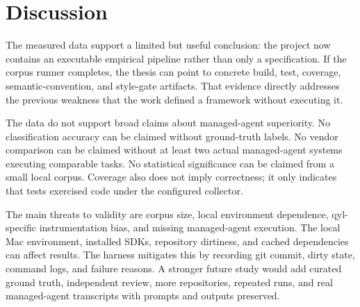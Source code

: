 \chapter{Discussion}

The measured data support a limited but useful conclusion: the project now contains an executable empirical pipeline rather than only a specification. If the corpus runner completes, the thesis can point to concrete build, test, coverage, semantic-convention, and style-gate artifacts. That evidence directly addresses the previous weakness that the work defined a framework without executing it.

The data do not support broad claims about managed-agent superiority. No classification accuracy can be claimed without ground-truth labels. No vendor comparison can be claimed without at least two actual managed-agent systems executing comparable tasks. No statistical significance can be claimed from a small local corpus. Coverage also does not imply correctness; it only indicates that tests exercised code under the configured collector.

The main threats to validity are corpus size, local environment dependence, qyl-specific instrumentation bias, and missing managed-agent execution. The local Mac environment, installed SDKs, repository dirtiness, and cached dependencies can affect results. The harness mitigates this by recording git commit, dirty state, command logs, and failure reasons. A stronger future study would add curated ground truth, independent review, more repositories, repeated runs, and real managed-agent transcripts with prompts and outputs preserved.
